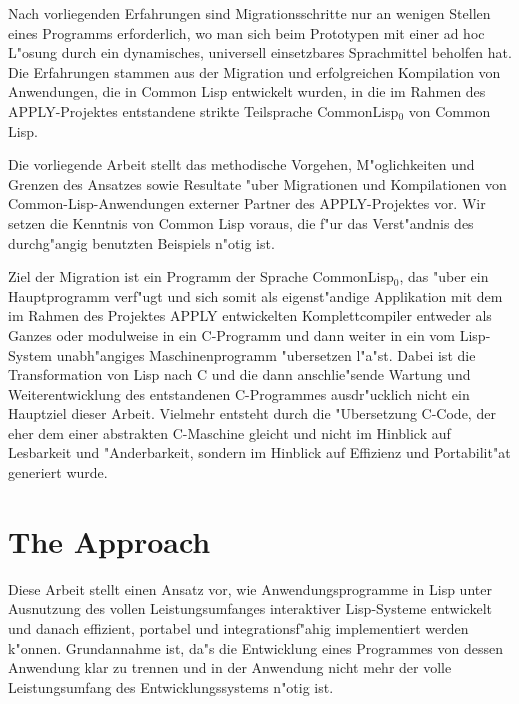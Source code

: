 Nach vorliegenden Erfahrungen sind Migrationsschritte nur an wenigen
Stellen eines Programms erforderlich, wo man sich beim Prototypen mit
einer ad hoc L"osung durch ein dynamisches, universell einsetzbares
Sprachmittel beholfen hat. Die Erfahrungen stammen aus der Migration
und erfolgreichen Kompilation von Anwendungen, die in Common Lisp
\cite{steele} \cite{steele90} entwickelt wurden, in die im Rahmen des
APPLY-Projektes entstandene strikte Teilsprache CommonLisp$_{0}$
von Common Lisp. 

Die vorliegende Arbeit stellt das methodische Vorgehen, M"oglichkeiten
und Grenzen des Ansatzes sowie Resultate "uber Migrationen und
Kompilationen von Common-Lisp-Anwendungen externer Partner des
APPLY-Projektes vor. Wir setzen die Kenntnis von Common Lisp
\cite{steele} \cite{steele90} voraus, die f"ur das Verst"andnis des
durchg"angig benutzten Beispiels n"otig ist.

Ziel der Migration ist ein Programm der Sprache CommonLisp$_{0}$,
das "uber ein Hauptprogramm verf"ugt und sich somit als eigenst"andige
Applikation mit dem im Rahmen des Projektes APPLY entwickelten
Komplettcompiler entweder als Ganzes oder modulweise in ein C-Programm
und dann weiter in ein vom Lisp-System unabh"angiges Maschinenprogramm
"ubersetzen l"a"st. Dabei ist die Transformation von Lisp nach C und
die dann anschlie"sende Wartung und Weiterentwicklung des entstandenen
C-Programmes ausdr"ucklich nicht ein Hauptziel dieser Arbeit. Vielmehr
entsteht durch die "Ubersetzung C-Code, der eher dem einer abstrakten
C-Maschine gleicht und nicht im Hinblick auf Lesbarkeit und
"Anderbarkeit, sondern im Hinblick auf Effizienz und Portabilit"at
generiert wurde.


\section{The Approach}

Diese Arbeit stellt einen Ansatz vor, wie Anwendungsprogramme in Lisp
unter Ausnutzung des vollen Leistungsumfanges interaktiver
Lisp-Systeme entwickelt und danach effizient, portabel und
integrationsf"ahig implementiert werden k"onnen. Grundannahme ist,
da"s die Entwicklung eines Programmes von dessen Anwendung klar zu
trennen und in der Anwendung nicht mehr der volle Leistungsumfang des
Entwicklungssystems n"otig ist.

